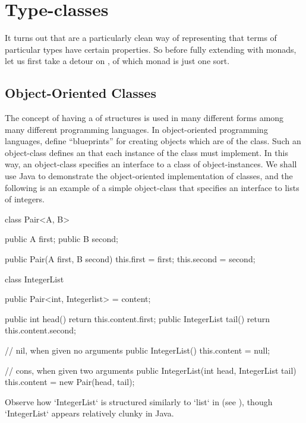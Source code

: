\section{Type-classes}
\label{sec:type-classes}

It turns out that  are a particularly clean way of representing that terms of particular types have certain properties.
So before fully extending \LangA with monads, let us first take a detour on , of which monad is just one sort.

\subsection{Object-Oriented Classes}

The concept of having a  of structures is used in many different forms among many different programming languages.
In object-oriented programming languages,  define ``blueprints'' for creating objects which are  of the class.
Such an object-class defines an  that each instance of the class must implement.
In this way, an object-class specifies an interface to a class of object-instances.
We shall use Java to demonstrate the object-oriented implementation of classes, and the following is an example of a simple object-class that specifies an interface to lists of integers.
\begin{snippet-Java}
class Pair<A, B> {
  public A first;
  public B second;

  public Pair(A first, B second) {
    this.first  = first;
    this.second = second;
  }
}

class IntegerList {
  public Pair<int, Integerlist> = content;

  public int         head() { return this.content.first; }
  public IntegerList tail() { return this.content.second; }

  // nil, when given no arguments
  public IntegerList() {
    this.content = null;
  }

  // cons, when given two arguments
  public IntegerList(int head, IntegerList tail) {
    this.content = new Pair(head, tail);
  }
}
\end{snippet-Java}
Observe how \code`IntegerList` is structured similarly to \code`list` in \LangA (see \prelude{\LangA}), though \code`IntegerList` appears relatively clunky in Java.


